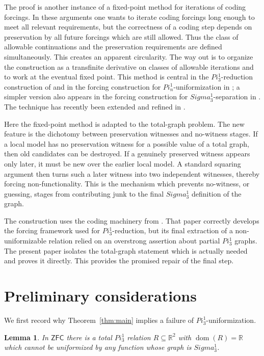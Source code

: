 \documentclass{article}
\newtheorem{lemma}[theorem]{Lemma}
\theoremstyle{remark}
\theoremstyle{plain}
\newcommand{\ZFC}{\mathsf{ZFC}}
\newcommand{\dom}{\operatorname{dom}}
\newcommand{\Real}{\mathbb{R}}
\def\mathbf#1{#1}%
\def\Pi{Pi}%
\def\Sigma{Sigma}%
\begin{document}
The proof is another instance of a fixed-point method for iterations of coding
forcings. In these arguments one wants to iterate coding forcings long enough
to meet all relevant requirements, but the correctness of a coding step depends
on preservation by all future forcings which are still allowed. Thus the class
of allowable continuations and the preservation requirements are defined
simultaneously. This creates an apparent circularity. The way out is to
organize the construction as a transfinite derivative on classes of allowable
iterations and to work at the eventual fixed point. This method is central in
the $\mathbf{\Pi}^1_3$-reduction construction of
\cite{HOFFELNER2023103292} and in the forcing construction for
$\mathbf{\Pi}^1_n$-uniformization in
\cite{hoffelner2022forcingpi1nuniformizationproperty}; a simpler version also
appears in the forcing construction for $\mathbf{\Sigma}^1_3$-separation in
\cite{H}. The technique has recently been extended and refined in
\cite{hoffelner2025forcinguppersigmauniformizationpresence}.

Here the fixed-point method is adapted to the total-graph problem. The new
feature is the dichotomy between preservation witnesses and no-witness stages.
If a local model has no preservation witness for a possible value of a total
graph, then old candidates can be destroyed. If a genuinely preserved witness
appears only later, it must be new over the earlier local model. A standard
squaring argument then turns such a later witness into two independent
witnesses, thereby forcing non-functionality. This is the mechanism which
prevents no-witness, or guessing, stages from contributing junk to the final
$\mathbf{\Sigma}^1_3$ definition of the graph.

The construction uses the coding machinery from
\cite{HOFFELNER2023103292}. That paper correctly develops the forcing
framework used for $\mathbf{\Pi}^1_3$-reduction, but its final extraction of a
non-uniformizable relation relied on an overstrong assertion about partial
$\mathbf{\Pi}^1_3$ graphs. The present paper isolates the total-graph statement
which is actually needed and proves it directly. This provides the promised
repair of the final step.
\section{Preliminary considerations}
We first record why Theorem~\ref{thm:main} implies a failure of $\mathbf{\Pi}^1_3$-uniformization.

\begin{lemma}\label{lem:no-sigma-unif}
In $\ZFC$ there is a total $\mathbf{\Pi}^1_3$ relation $R\subseteq \Real^2$ with $\dom(R)=\Real$ which cannot be uniformized by any function whose graph is $\mathbf{\Sigma}^1_3$.
\end{lemma}
\end{document}
